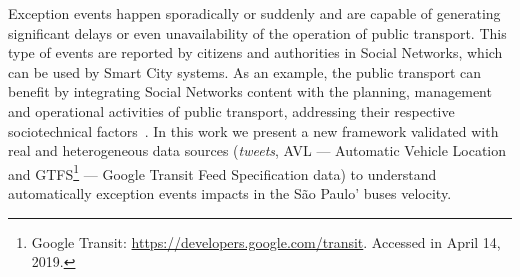 \documentclass[runningheads]{llncs}
\begin{document}
Exception events happen sporadically or suddenly and are capable of generating significant delays or even unavailability of the operation of public transport. This type of events are reported by citizens and authorities in Social Networks, which can be used by Smart City systems. As an example, the public transport can benefit by integrating Social Networks content with the planning, management and operational activities of public transport, addressing their respective sociotechnical factors~\cite{kuflik2017automating}. In this work we present a new framework validated with real and heterogeneous data sources (\textit{tweets}, AVL --- Automatic Vehicle Location and GTFS\footnote{\label{googleTransit}Google Transit: \url{https://developers.google.com/transit}. Accessed in April 14, 2019.} --- Google Transit Feed Specification data) to understand automatically exception events impacts in the São Paulo' buses velocity.

\end{document}
